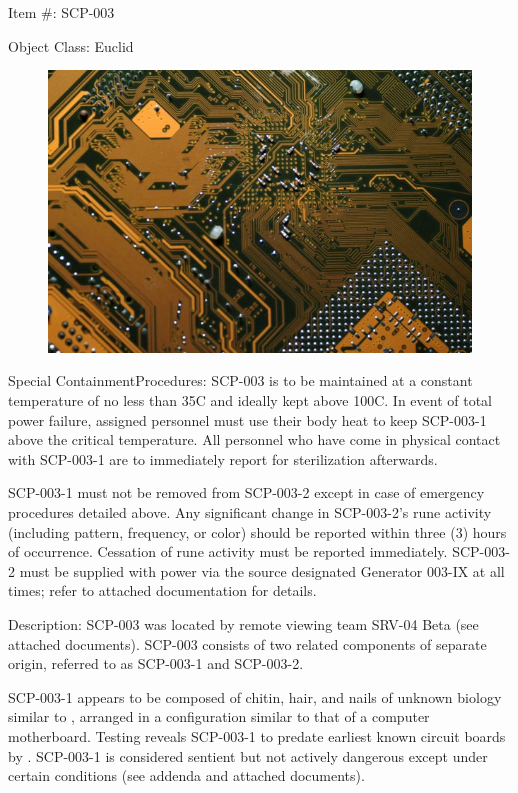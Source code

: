 Item \#: SCP-003

Object Class: Euclid

\begin{figure}
\includegraphics[scale=0.34]{scp/003.jpg}
\end{figure}

Special Containment\linebreak Procedures: SCP-003 is to be maintained at a constant temperature of no less than 35\degree C and ideally kept above 100\degree C. In event of total power failure, assigned personnel must use their body heat to keep SCP-003-1 above the critical temperature. All personnel who have come in physical contact with SCP-003-1 are to immediately report for sterilization afterwards.

SCP-003-1 must not be removed from SCP-003-2 except in case of emergency procedures detailed above. Any significant change in SCP-003-2's rune activity (including pattern, frequency, or color) should be reported within three (3) hours of occurrence. Cessation of rune activity must be reported immediately. SCP-003-2 must be supplied with power via the source designated Generator 003-IX at all times; refer to attached documentation for details.

Description: SCP-003 was located by remote viewing team SRV-04 Beta (see attached documents). SCP-003 consists of two related components of separate origin, referred to as SCP-003-1 and SCP-003-2.

SCP-003-1 appears to be composed of chitin, hair, and nails of unknown biology similar to \redacted, arranged in a configuration similar to that of a computer motherboard. Testing reveals SCP-003-1 to predate earliest known circuit boards by \redacted. SCP-003-1 is considered sentient but not actively dangerous except under certain conditions (see addenda and attached documents).

